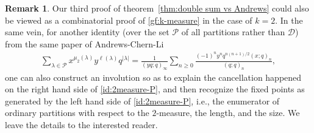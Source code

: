 \documentclass[11pt,reqno]{amsart}
\numberwithin{equation}{section}
\theoremstyle{plain}
\theoremstyle{definition}
\newtheorem{remark}[theorem]{Remark}
\theoremstyle{named}
\def\cD{\mathcal{D}}
\def\cP{\mathcal{P}}
\def\la{\lambda}
\begin{document}
\begin{remark}
Our third proof of theorem~\ref{thm:double sum vs Andrews} could also be viewed as a combinatorial proof of \eqref{gf:k-measure} in the case of $k=2$. In the same vein, for another identity (over the set $\cP$ of all partitions rather than $\cD$) from the same paper of Andrews-Chern-Li~\cite[$k=2$ case of Eq.~(1)]{ACL22} 
\begin{align}\label{id:2measure-P}
\sum_{\la\in \cP}x^{\mu_{2}(\la)}y^{\ell(\la)}q^{|\la|}=\frac{1}{(yq; q)_{\infty}}\sum_{n\geq 0}\frac{(-1)^ny^nq^{n(n+1)/2}(x; q)_{n}}{(q; q)_n},
\end{align}
one can also construct an involution so as to explain the cancellation happened on the right hand side of \eqref{id:2measure-P}, and then recognize the fixed points as generated by the left hand side of \eqref{id:2measure-P}, i.e., the enumerator of ordinary partitions with respect to the $2$-measure, the length, and the size. We leave the details to the interested reader.
\end{remark}
\end{document}
